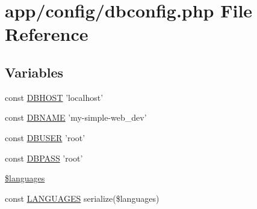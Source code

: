 \hypertarget{dbconfig_8php}{\section{app/config/dbconfig.php File Reference}
\label{dbconfig_8php}
}
\subsection*{Variables}
\begin{DoxyCompactItemize}
\item 
const \hyperlink{dbconfig_8php_a40edb9274f7711736cc3ee12d2e5ddba}{D\-B\-H\-O\-S\-T} 'localhost'
\item 
const \hyperlink{dbconfig_8php_af7d219badcc93cc3a13a604c769542bc}{D\-B\-N\-A\-M\-E} 'my-\/simple-\/web\-\_\-dev'
\item 
const \hyperlink{dbconfig_8php_a221f39b0b526c043e3a1ade2dd56a70e}{D\-B\-U\-S\-E\-R} 'root'
\item 
const \hyperlink{dbconfig_8php_add7bef9fbed1ad1fa386dcb65fd5d813}{D\-B\-P\-A\-S\-S} 'root'
\item 
\hyperlink{dbconfig_8php_a8856d0a49881ef8e0a6d205d37d4a7af}{\$languages}
\item 
const \hyperlink{dbconfig_8php_a7596b0ea0c3739ff22831f52f857af58}{L\-A\-N\-G\-U\-A\-G\-E\-S} serialize(\$languages)
\end{DoxyCompactItemize}


